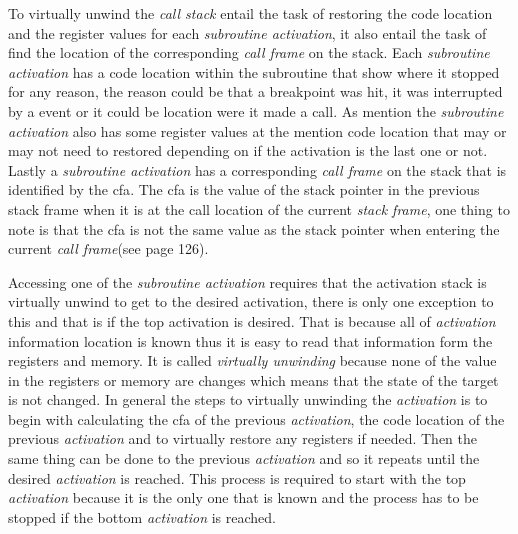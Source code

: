  


To virtually unwind the \emph{call stack} entail the task of restoring the code location and the register values for each \emph{subroutine activation}, it also entail the task of find the location of the corresponding \emph{call frame} on the stack.
Each \emph{subroutine activation} has a code location within the subroutine that show where it stopped for any reason, the reason could be that a breakpoint was hit, it was interrupted by a event or it could be location were it made a call.
As mention the \emph{subroutine activation} also has some register values at the mention code location that may or may not need to restored depending on if the activation is the last one or not.
Lastly a \emph{subroutine activation} has a corresponding \emph{call frame} on the stack that is identified by the \gls{cfa}.
The \gls{cfa} is the value of the stack pointer in the previous stack frame when it is at the call location of the current \emph{stack frame}, one thing to note is that the \gls{cfa} is not the same value as the stack pointer when entering the current \emph{call frame}(see \cite{DWARF} page 126).

Accessing one of the \emph{subroutine activation} requires that the activation stack is virtually unwind to get to the desired activation, there is only one exception to this and that is if the top activation is desired.
That is because all of \emph{activation} information location is known thus it is easy to read that information form the registers and memory. 
It is called \emph{virtually unwinding} because none of the value in the registers or memory are changes which means that the state of the target is not changed.
In general the steps to virtually unwinding the \emph{activation} is to begin with calculating the \gls{cfa} of the previous \emph{activation}, the code location of the previous \emph{activation} and to virtually restore any registers if needed.
Then the same thing can be done to the previous \emph{activation} and so it repeats until the desired \emph{activation} is reached.
This process is required to start with the top \emph{activation} because it is the only one that is known and the process has 
to be stopped if the bottom \emph{activation} is reached.

